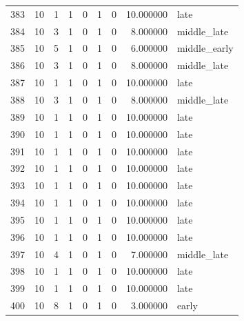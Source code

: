 \begin{longtable}{rrrrrrrrl}
383 & 10 & 1 & 1 & 0 & 1 & 0 & 10.000000 & late \\
384 & 10 & 3 & 1 & 0 & 1 & 0 & 8.000000 & middle\_late \\
385 & 10 & 5 & 1 & 0 & 1 & 0 & 6.000000 & middle\_early \\
386 & 10 & 3 & 1 & 0 & 1 & 0 & 8.000000 & middle\_late \\
387 & 10 & 1 & 1 & 0 & 1 & 0 & 10.000000 & late \\
388 & 10 & 3 & 1 & 0 & 1 & 0 & 8.000000 & middle\_late \\
389 & 10 & 1 & 1 & 0 & 1 & 0 & 10.000000 & late \\
390 & 10 & 1 & 1 & 0 & 1 & 0 & 10.000000 & late \\
391 & 10 & 1 & 1 & 0 & 1 & 0 & 10.000000 & late \\
392 & 10 & 1 & 1 & 0 & 1 & 0 & 10.000000 & late \\
393 & 10 & 1 & 1 & 0 & 1 & 0 & 10.000000 & late \\
394 & 10 & 1 & 1 & 0 & 1 & 0 & 10.000000 & late \\
395 & 10 & 1 & 1 & 0 & 1 & 0 & 10.000000 & late \\
396 & 10 & 1 & 1 & 0 & 1 & 0 & 10.000000 & late \\
397 & 10 & 4 & 1 & 0 & 1 & 0 & 7.000000 & middle\_late \\
398 & 10 & 1 & 1 & 0 & 1 & 0 & 10.000000 & late \\
399 & 10 & 1 & 1 & 0 & 1 & 0 & 10.000000 & late \\
400 & 10 & 8 & 1 & 0 & 1 & 0 & 3.000000 & early \\
\end{longtable}
